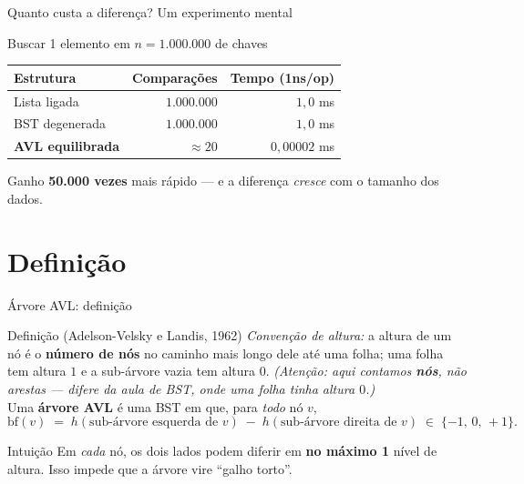 \documentclass[aspectratio=169]{beamer}
\begin{document}
\begin{frame}{Quanto custa a diferença? Um experimento mental}
  \begin{block}{Buscar 1 elemento em $n = 1.000.000$ de chaves}
  \centering
  \begin{tabular}{lrr}
    \toprule
    Estrutura & Comparações & Tempo (1ns/op) \\
    \midrule
    Lista ligada           & $1.000.000$ & $1{,}0$ ms \\
    BST degenerada         & $1.000.000$ & $1{,}0$ ms \\
    \textbf{AVL equilibrada} & $\approx 20$ & $0{,}00002$ ms \\
    \bottomrule
  \end{tabular}
  \end{block}
  \begin{exampleblock}{Ganho}
    \textbf{50.000 vezes} mais rápido — e a diferença \emph{cresce}
    com o tamanho dos dados.
  \end{exampleblock}
\end{frame}

\section{Definição}

\begin{frame}{Árvore AVL: definição}
  \begin{block}{Definição (Adelson-Velsky e Landis, 1962)}
    \emph{Convenção de altura:} a altura de um nó é o \textbf{número de nós}
    no caminho mais longo dele até uma folha; uma folha tem altura $1$ e a
    sub-árvore vazia tem altura $0$.
    {\scriptsize\emph{(Atenção: aqui contamos \textbf{nós}, não arestas ---
    difere da aula de BST, onde uma folha tinha altura $0$.)}}\\[4pt]
    Uma \textbf{árvore AVL} é uma BST em que, para \emph{todo} nó $v$,
    \[
      \mathrm{bf}(v) \;=\; h(\text{sub-árvore esquerda de }v)
                       \;-\; h(\text{sub-árvore direita de }v)
      \;\in\; \{-1,\,0,\,+1\}.
    \]
  \end{block}
  \begin{exampleblock}{Intuição}
    Em \emph{cada} nó, os dois lados podem diferir em \textbf{no máximo 1}
    nível de altura. Isso impede que a árvore vire ``galho torto''.
  \end{exampleblock}
\end{frame}
\end{document}
